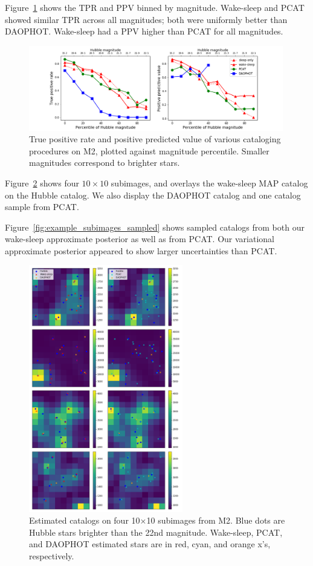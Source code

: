 Figure~\ref{fig:summary_stats} shows the TPR and PPV binned by magnitude.
Wake-sleep and PCAT showed similar TPR across all magnitudes; both were
uniformly better than DAOPHOT. Wake-sleep had a PPV higher than PCAT for all magnitudes. 
\begin{figure}[ht]
    \centering
    \includegraphics[width=0.99\textwidth]{figures/summary_statistics_m2.png}
    \caption{True positive rate and positive predicted value of various cataloging
    procedures on M2, plotted against magnitude percentile.
    Smaller magnitudes correspond to brighter stars. }
    \label{fig:summary_stats}
\end{figure}


Figure~\ref{fig:example_subimages} shows four $10\times10$ subimages, and overlays the wake-sleep MAP catalog on the Hubble catalog. We also display the DAOPHOT catalog and one catalog sample from PCAT.

Figure~\ref{fig:example_subimages_sampled} shows sampled catalogs from both our wake-sleep approximate posterior as well as from PCAT.
Our variational approximate posterior appeared to show larger uncertainties
than PCAT. 
\newpage

\begin{figure}[H]
    \centering
    \includegraphics[width=0.6\textwidth]{figures/example_subimages.png}
    \caption{Estimated catalogs on four 10$\times$10 subimages from
    M2. Blue dots are Hubble stars brighter than the 22nd magnitude.
    Wake-sleep, PCAT, and DAOPHOT estimated stars are in
    red, cyan, and orange x's, respectively. }
    \label{fig:example_subimages}
\end{figure}
\newpage

